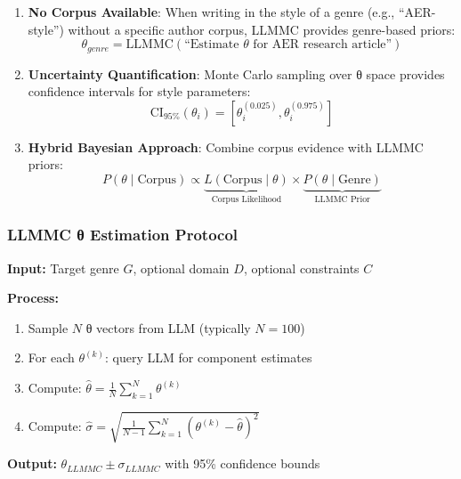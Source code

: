 \begin{enumerate}
    \item \textbf{No Corpus Available}: When writing in the style of a genre (e.g., ``AER-style'')
    without a specific author corpus, LLMMC provides genre-based priors:
    \begin{equation}
    \theta_{genre} = \text{LLMMC}(\text{``Estimate } \theta \text{ for AER research article''})
    \end{equation}

    \item \textbf{Uncertainty Quantification}: Monte Carlo sampling over θ space provides
    confidence intervals for style parameters:
    \begin{equation}
    \text{CI}_{95\%}(\theta_i) = [\theta_i^{(0.025)}, \theta_i^{(0.975)}]
    \end{equation}

    \item \textbf{Hybrid Bayesian Approach}: Combine corpus evidence with LLMMC priors:
    \begin{equation}
    P(\theta \mid \text{Corpus}) \propto \underbrace{L(\text{Corpus} \mid \theta)}_{\text{Corpus Likelihood}} \times \underbrace{P(\theta \mid \text{Genre})}_{\text{LLMMC Prior}}
    \end{equation}
\end{enumerate}

\subsubsection{LLMMC θ Estimation Protocol}

\begin{tcolorbox}[colback=blue!5!white, colframe=blue!75!black, title=LLMMC θ Estimation]
\textbf{Input:} Target genre $G$, optional domain $D$, optional constraints $C$

\textbf{Process:}
\begin{enumerate}
    \item Sample $N$ θ vectors from LLM (typically $N=100$)
    \item For each $\theta^{(k)}$: query LLM for component estimates
    \item Compute: $\hat{\theta} = \frac{1}{N}\sum_{k=1}^{N} \theta^{(k)}$
    \item Compute: $\hat{\sigma} = \sqrt{\frac{1}{N-1}\sum_{k=1}^{N} (\theta^{(k)} - \hat{\theta})^2}$
\end{enumerate}

\textbf{Output:} $\theta_{LLMMC} \pm \sigma_{LLMMC}$ with 95\% confidence bounds
\end{tcolorbox}

